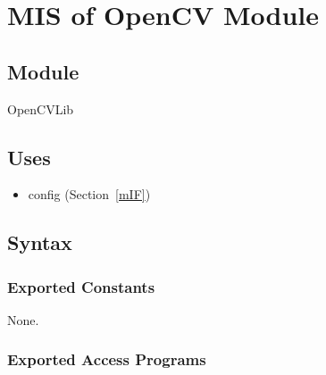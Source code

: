 \documentclass[12pt, titlepage]{article}
\begin{document}
\section{MIS of OpenCV Module} \label{mOpenCV}


\subsection{Module}

OpenCVLib

\subsection{Uses}
\begin{itemize}
  \item config (Section~\ref{mIF})
\end{itemize}

\subsection{Syntax}

\subsubsection{Exported Constants}
None.

\subsubsection{Exported Access Programs}
\end{document}
